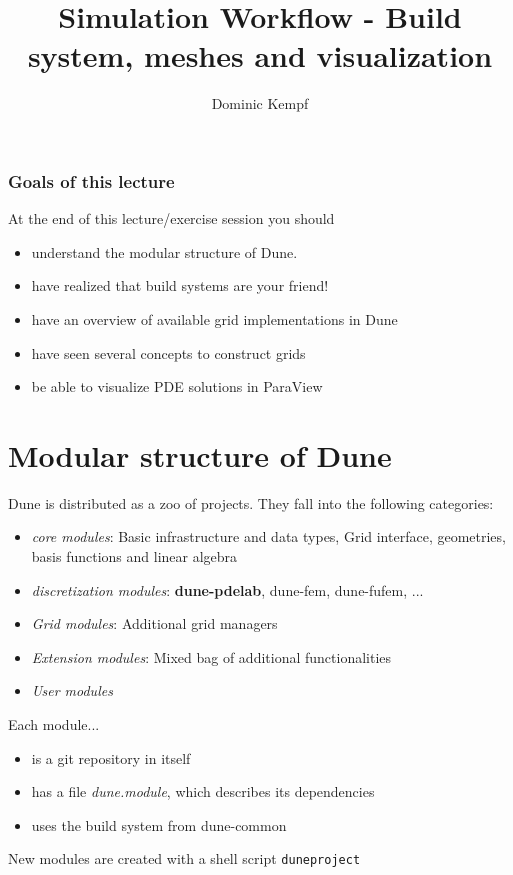 \documentclass[ignorenonframetext,11pt]{beamer}
\title{Simulation Workflow - Build system, meshes and visualization}
\author{Dominic Kempf}
\theoremstyle{definition}
\begin{document}
\begin{frame}
\titlepage
\end{frame}

\begin{frame}
 \frametitle{Goals of this lecture}

 At the end of this lecture/exercise session you should
 \begin{itemize}
  \item understand the modular structure of Dune.
  \item have realized that build systems are your friend!
  \item have an overview of available grid implementations in Dune
  \item have seen several concepts to construct grids
  \item be able to visualize PDE solutions in ParaView
 \end{itemize}

\end{frame}


\section{Modular structure of Dune}

\begin{frame}[fragile]
 Dune is distributed as a zoo of projects.
 They fall into the following categories:

 \begin{itemize}
  \item \textit{core modules}: Basic infrastructure and data types,
  Grid interface, geometries, basis functions and linear algebra
  \item \textit{discretization modules}: \textbf{dune-pdelab},
  dune-fem, dune-fufem, ...
  \item \textit{Grid modules}: Additional grid managers
  \item \textit{Extension modules}: Mixed bag of additional functionalities
  \item \textit{User modules}
 \end{itemize}

 Each module...
 \begin{itemize}
  \item is a git repository in itself
  \item has a file \textit{dune.module}, which describes its dependencies
  \item uses the build system from dune-common
 \end{itemize}

 New modules are created with a shell script \lstinline!duneproject!
\end{frame}
\end{document}
